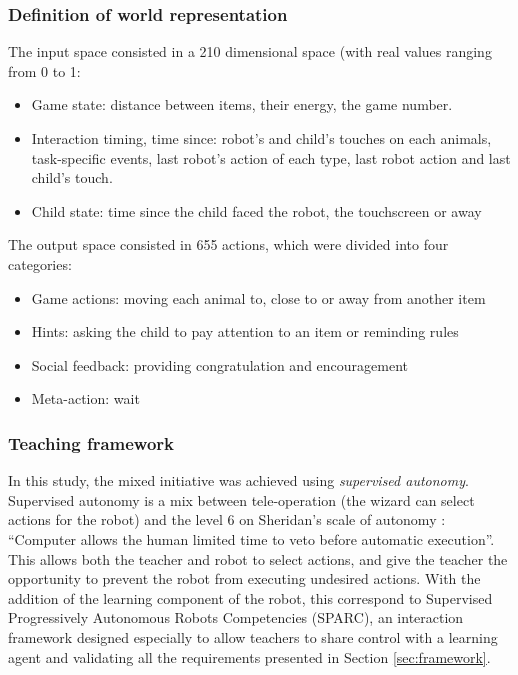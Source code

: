 \documentclass[manuscript, review, anonymous]{acmart}
\begin{document}
\subsubsection{Definition of world representation}

The input space consisted in a 210 dimensional space (with real
values ranging from 0 to 1:
\begin{itemize}
    \item Game state: distance between items, their energy, the game number.
    \item Interaction timing, time since: robot's and child's touches on each animals,
    task-specific events, last robot's action of each type, last robot action and last child's touch.
    \item Child state: time since the child faced the robot, the touchscreen or away
\end{itemize}

The output space consisted in 655 actions, which were divided into four categories:
\begin{itemize}
    \item Game actions: moving each animal to, close to or away from another item
    \item Hints: asking the child to pay attention to an item or reminding rules
    \item Social feedback: providing congratulation and encouragement
    \item Meta-action: wait
\end{itemize}

\subsubsection{Teaching framework}
In this study, the mixed initiative was achieved using \emph{supervised autonomy}.
Supervised autonomy is a mix between tele-operation (the wizard can select
actions for the robot) and the level 6 on Sheridan's scale of autonomy
\cite{sheridan1978human}: ``Computer allows the human limited time to veto
before automatic execution''. This allows both the teacher and robot to select
actions, and give the teacher the opportunity to prevent the robot from
executing undesired actions.  With the addition of the learning component of the
robot, this correspond to Supervised Progressively Autonomous Robots
Competencies (SPARC)\cite{senft2015sparc}, an interaction framework designed
especially to allow teachers to share control with a learning agent and 
validating all the requirements presented in Section \ref{sec:framework}.
\end{document}
